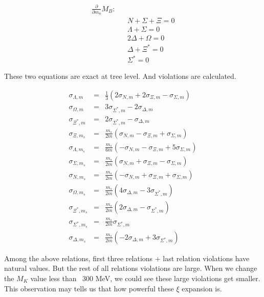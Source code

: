 \documentclass[10pt,a4paper]{article}
\begin{document}
\begin{eqnarray}
\frac{\partial}{\partial m_8} M_B : & & \nonumber  \\
& & N+\Sigma +\Xi =0 \nonumber \\
& & \Lambda +\Sigma =0 \nonumber \\
& & 2 \Delta + \Omega =0   \\
& & \Delta + \Xi^* =0 \nonumber \\
& & \Sigma^* =0 \nonumber
\end{eqnarray}

These two equations are exact at tree level. And violations are calculated.

 \begin{eqnarray}
 \sigma_{\Lambda ,m}&=& \frac{1}{3} \left(2 \sigma _{N,m}+2 \sigma _{\Xi,m}-\sigma _{\Sigma,m}\right) \\ 
 \sigma _{\Omega ,m}&=& 3 \sigma_{{\Sigma ^*},m}-2 \sigma _{\Delta ,m}\\ 
 \sigma_{{\Xi ^*},m}&=& 2 \sigma _{{\Sigma^*},m}-\sigma _{\Delta ,m} \\  
 \sigma _{\Xi ,{m_s}}&=&  \frac{m_s}{2m}( \sigma_{N,m}- \sigma _{\Xi ,m}+ \sigma _{\Sigma,m})\\
 \sigma _{\Lambda ,{m_s}}&=&   \frac{m_s}{6m}( -  \sigma_{N,m}-  \sigma _{\Xi ,m}+5   \sigma _{\Sigma,m})\\
 \sigma _{\Sigma ,{m_s}}&=&   \frac{m_s}{2m}( \sigma_{N,m}+ \sigma _{\Xi ,m}-\sigma _{\Sigma,m}) \\
 \sigma _{N,{m_s}}&=& \frac{m_s}{2m}(  - \sigma_{N,m}+ \sigma _{\Xi ,m}+\sigma _{\Sigma,m})  \\
 \sigma _{\Omega ,{m_s}}&=& \frac{m_s}{2m}\left(4 \sigma_{\Delta ,m}-3 \sigma _{{\Sigma ^*},m}\right) \\
 \sigma _{{\Xi ^*},{m_s}}&=& \frac{{m_s}}{2 m}\left(2 \sigma _{\Delta ,m}-\sigma _{{\Sigma^*},m}\right) \\ 
\sigma _{{\Sigma ^*},{m_s}}&=&\frac{{m_s}}{2 m} \sigma _{{\Sigma ^*},m}\\ 
\sigma_{\Delta ,{m_s}}&=& \frac{{m_s} }{2 m}\left(-2 \sigma _{\Delta,m}+3 \sigma _{{\Sigma ^*},m}\right)  
 \end{eqnarray}

Among the above relations, first three relations + last relation violations have natural values. But the rest of all relations violations are large. When we change the $M_K$ value less than ~300 MeV, we could see these large violations get smaller. This observation may tells us that how powerful these $\xi$ expansion is.
\end{document}
